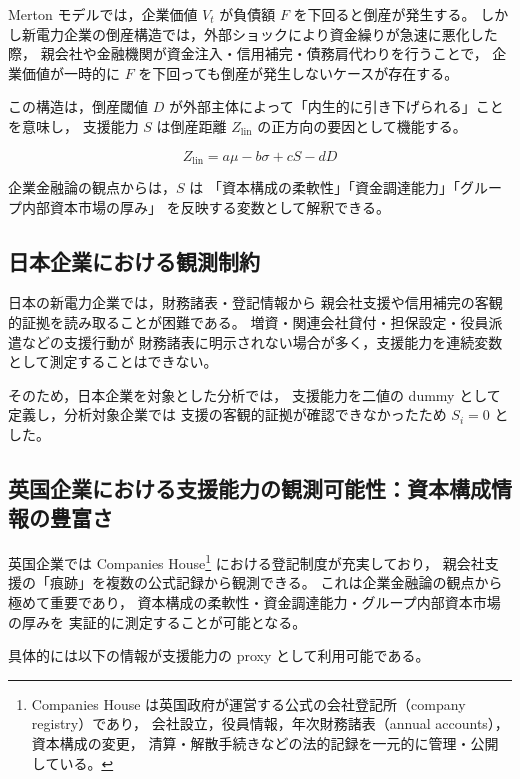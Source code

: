 Merton モデルでは，企業価値 $V_t$ が負債額 $F$ を下回ると倒産が発生する。
しかし新電力企業の倒産構造では，外部ショックにより資金繰りが急速に悪化した際，
親会社や金融機関が資金注入・信用補完・債務肩代わりを行うことで，
企業価値が一時的に $F$ を下回っても倒産が発生しないケースが存在する。

この構造は，倒産閾値 $D$ が外部主体によって「内生的に引き下げられる」ことを意味し，
支援能力 $S$ は倒産距離 $Z_{\text{lin}}$ の正方向の要因として機能する。



\[
Z_{\text{lin}} = a\mu - b\sigma + cS - dD
\]



企業金融論の観点からは，$S$ は
「資本構成の柔軟性」「資金調達能力」「グループ内部資本市場の厚み」
を反映する変数として解釈できる。

\subsection{日本企業における観測制約}

日本の新電力企業では，財務諸表・登記情報から
親会社支援や信用補完の客観的証拠を読み取ることが困難である。
増資・関連会社貸付・担保設定・役員派遣などの支援行動が
財務諸表に明示されない場合が多く，支援能力を連続変数として測定することはできない。

そのため，日本企業を対象とした分析では，
支援能力を二値の dummy として定義し，分析対象企業では
支援の客観的証拠が確認できなかったため $S_i = 0$ とした。

\subsection{英国企業における支援能力の観測可能性：資本構成情報の豊富さ}

英国企業では Companies House\footnote{
Companies House は英国政府が運営する公式の会社登記所（company registry）であり，
会社設立，役員情報，年次財務諸表（annual accounts），資本構成の変更，
清算・解散手続きなどの法的記録を一元的に管理・公開している。
} における登記制度が充実しており，
親会社支援の「痕跡」を複数の公式記録から観測できる。
これは企業金融論の観点から極めて重要であり，
資本構成の柔軟性・資金調達能力・グループ内部資本市場の厚みを
実証的に測定することが可能となる。

具体的には以下の情報が支援能力の proxy として利用可能である。

